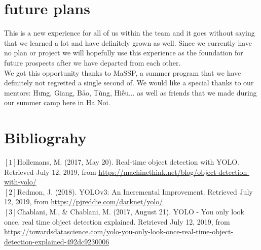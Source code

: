 \documentclass{article}
\begin{document}
\section{future plans}
\tab This is a new experience for all of us within the team and it goes without saying that we learned a lot and have definitely grown as well. Since we currently have no plan or project we will hopefully use this experience as the foundation for future prospects after we have departed from each other.\\
We got this opportunity thanks to MaSSP, a summer program that we have definitely not regretted a single second of. We would like a special thanks to our mentors: Hưng, Giang, Bảo, Tùng, Hiếu... as well as friends that we made during our summer camp here in Ha Noi.

\section{Bibliograhy}
$[1]$Hollemans, M. (2017, May 20). Real-time object detection with YOLO. Retrieved July 12, 2019, from \url{https://machinethink.net/blog/object-detection-with-yolo/}\\
\tab $[2]$Redmon, J. (2018). YOLOv3: An Incremental Improvement. Retrieved July 12, 2019, from \url{https://pjreddie.com/darknet/yolo/}\\
\tab $[3]$Chablani, M., \& Chablani, M. (2017, August 21). YOLO - You only look once, real time object detection explained. Retrieved July 12, 2019, from \url{https://towardsdatascience.com/yolo-you-only-look-once-real-time-object-detection-explained-492dc9230006}
\end{document}

